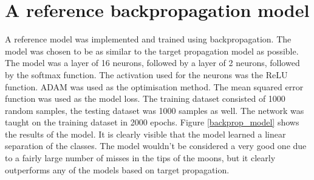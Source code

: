 \section{A reference backpropagation model}
A reference model was implemented and trained using backpropagation. The model was chosen to be as similar to the target propagation model as possible. The model was a layer of 16 neurons, followed by a layer of 2 neurons, followed by the softmax function. The activation used for the neurons was the ReLU function. ADAM was used as the optimisation method. The mean squared error function was used as the model loss. The training dataset consisted of 1000 random samples, the testing dataset was 1000 samples as well. The network was taught on the training dataset in 2000 epochs. Figure \ref{backprop_model} shows the results of the model. It is clearly visible that the model learned a linear separation of the classes. The model wouldn't be considered a very good one due to a fairly large number of misses in the tips of the moons, but it clearly outperforms any of the models based on target propagation.

